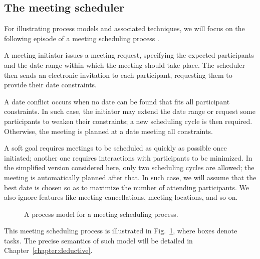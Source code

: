 \subsection{The meeting scheduler\label{subsection:background-meeting-scheduler}}

For illustrating process models and associated techniques, we will focus on the following episode of a meeting scheduling process \cite{Feather:1997}. 

A meeting initiator issues a meeting request, specifying the expected participants and the date range within which the meeting should take place. The scheduler then sends an electronic invitation to each participant, requesting them to provide their date constraints. 

A date conflict occurs when no date can be found that fits all participant constraints. In such case, the initiator may extend the date range or request some participants to weaken their constraints; a new scheduling cycle is then required. Otherwise, the meeting is planned at a date meeting all constraints.

A soft goal requires meetings to be scheduled as quickly as possible once initiated; another one requires interactions with participants to be minimized. In the simplified version considered here, only two scheduling cycles are allowed; the meeting is automatically planned after that. In such case, we will assume that the best date is chosen so as to maximize the number of attending participants. We also ignore features like meeting cancellations, meeting locations, and so on.

\begin{figure}[H]\centering
{}
\caption{A process model for a meeting scheduling process.\label{image:scheduler-ghmsc}}
\end{figure}

This meeting scheduling process is illustrated in Fig.~\ref{image:scheduler-ghmsc}, where boxes denote tasks. The precise semantics of such model will be detailed in Chapter~\ref{chapter:deductive}.

